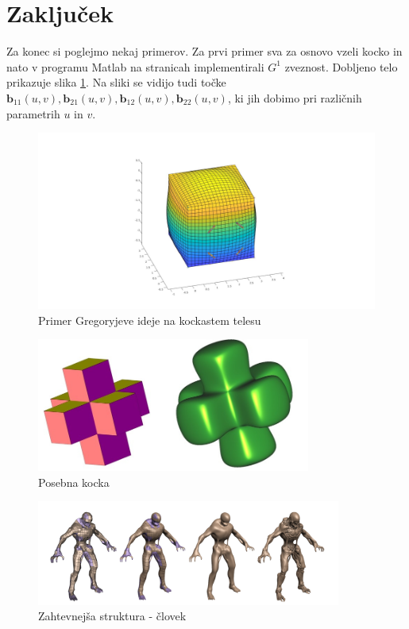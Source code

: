 \documentclass[a4paper,regno]{article}
\newcommand{\tbf}{\textbf}
\begin{document}
\section{Zaključek}
Za konec si poglejmo nekaj primerov. Za prvi primer  sva za osnovo vzeli kocko in nato v programu Matlab na stranicah implementirali $G^1$ zveznost. Dobljeno telo prikazuje slika \ref{fig:g_kocka}. Na sliki se vidijo tudi točke $\tbf{b}_{11}(u,v),
\tbf{b}_{21}(u,v), \tbf{b}_{12}(u,v), \tbf{b}_{22}(u,v)$, ki jih dobimo pri različnih parametrih $u$ in $v$.
\begin{figure}[H]
	\centering
	\includegraphics[width=15cm]{gregory_kocka.jpg}
	\caption{Primer Gregoryjeve ideje na kockastem telesu}
	\label{fig:g_kocka}
\end{figure}

\begin{figure}[h]
	\centering
	\includegraphics[width=9cm]{posebna_kocka.jpg}
	\caption{Posebna kocka}
\end{figure}

\begin{figure}[H]
	\centering
	\includegraphics[width=10cm]{koncni_primer.png}
	\caption{Zahtevnejša struktura - človek}
	\label{človek}
\end{figure}
\end{document}
